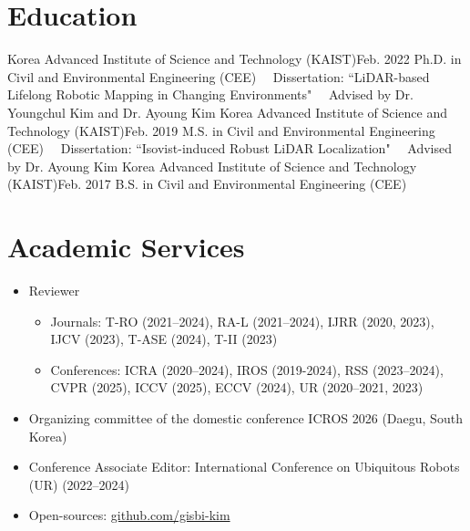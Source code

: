 \documentclass{cv} %
\begin{document}
\section{Education}
  \resumeSubHeadingListStart
    \resumeSubheadingFourLines
      {Korea Advanced Institute of Science and Technology (KAIST)}{Feb. 2022}
      {Ph.D. in Civil and Environmental Engineering (CEE)}{ } 
      {\ \ Dissertation: ``LiDAR-based Lifelong Robotic Mapping in Changing Environments"}{}
      {\ \ Advised by Dr. Youngchul Kim and Dr. Ayoung Kim}{}
    \vspace{1mm}
    \resumeSubheadingFourLines
      {Korea Advanced Institute of Science and Technology (KAIST)}{Feb. 2019}
      {M.S. in Civil and Environmental Engineering (CEE)}{ } 
      {\ \ Dissertation: ``Isovist-induced Robust LiDAR Localization"}{}
      {\ \ Advised by Dr. Ayoung Kim}{}
    \vspace{1mm}
    \resumeSubheading
      {Korea Advanced Institute of Science and Technology (KAIST)}{Feb. 2017}
      {B.S. in Civil and Environmental Engineering (CEE)}{ }
  \resumeSubHeadingListEnd


\section{Academic Services}
\begin{itemize}[label=$\cdot$]
\item Reviewer
\vspace{-2mm}
    \begin{itemize}[label=$\cdot$]
    \item Journals:  T-RO (2021--2024), RA-L (2021--2024), IJRR (2020, 2023), IJCV (2023), T-ASE (2024), T-II (2023)
    \vspace{-2mm}
    \item Conferences: ICRA (2020--2024), IROS (2019-2024), RSS (2023--2024), CVPR (2025), ICCV (2025), ECCV (2024), UR (2020--2021, 2023)
    \end{itemize}
\vspace{-1mm}
\item Organizing committee of the domestic conference ICROS 2026 (Daegu, South Korea)
\vspace{-1mm}
\item Conference Associate Editor: International Conference on Ubiquitous Robots (UR) (2022--2024) 
\vspace{-1mm}
\item Open-sources: \href{https://github.com/gisbi-kim}{github.com/gisbi-kim}
\vspace{-1mm}
\end{itemize}
\end{document}
